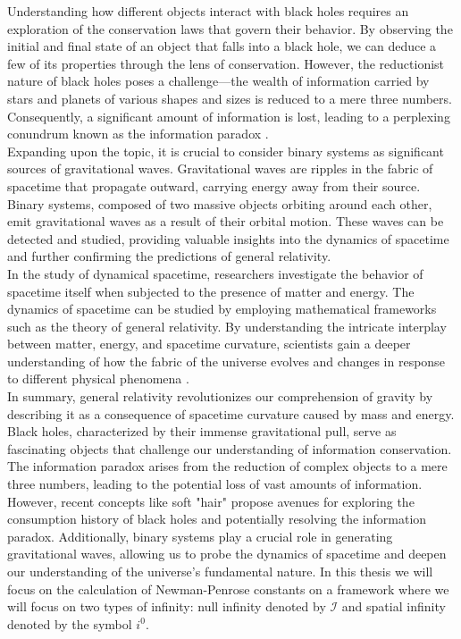 Understanding how different objects interact with black holes requires an exploration of the conservation laws that govern their behavior. By observing the initial and final state of an object that falls into a black hole, we can deduce a few of its properties through the lens of conservation. However, the reductionist nature of black holes poses a challenge—the wealth of information carried by stars and planets of various shapes and sizes is reduced to a mere three numbers. Consequently, a significant amount of information is lost, leading to a perplexing conundrum known as the information paradox \cite{HawMalStr16}. \\

Expanding upon the topic, it is crucial to consider binary systems as significant sources of gravitational waves. Gravitational waves are ripples in the fabric of spacetime that propagate outward, carrying energy away from their source. Binary systems, composed of two massive objects orbiting around each other, emit gravitational waves as a result of their orbital motion. These waves can be detected and studied, providing valuable insights into the dynamics of spacetime and further confirming the predictions of general relativity. \\

In the study of dynamical spacetime, researchers investigate the behavior of spacetime itself when subjected to the presence of matter and energy. The dynamics of spacetime can be studied by employing mathematical frameworks such as the theory of general relativity. By understanding the intricate interplay between matter, energy, and spacetime curvature, scientists gain a deeper understanding of how the fabric of the universe evolves and changes in response to different physical phenomena \cite{DaiVal02}. \\

In summary, general relativity revolutionizes our comprehension of gravity by describing it as a consequence of spacetime curvature caused by mass and energy. Black holes, characterized by their immense gravitational pull, serve as fascinating objects that challenge our understanding of information conservation. The information paradox arises from the reduction of complex objects to a mere three numbers, leading to the potential loss of vast amounts of information. However, recent concepts like soft "hair" propose avenues for exploring the consumption history of black holes and potentially resolving the information paradox. Additionally, binary systems play a crucial role in generating gravitational waves, allowing us to probe the dynamics of spacetime and deepen our understanding of the universe's fundamental nature. In this thesis we will focus on the calculation of Newman-Penrose constants on a framework where we will focus on two types of infinity: null infinity denoted by $\mathscr{I}$ and spatial infinity denoted by the symbol $i^0$.


